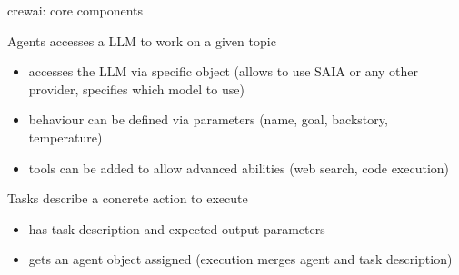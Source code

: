\documentclass[t]{beamer}
\numberwithin{equation}{section}
\begin{document}
	\begin{frame}[b]{crewai: core components}
		\begin{block}{Agents\autocite{agentPy}}
			accesses a LLM to work on a given topic
			\pause
			\begin{itemize}
				\item accesses the LLM via specific object (allows to use SAIA or any other provider, specifies which model to use)
				\item behaviour can be defined via parameters (name, goal, backstory, temperature)
				\item tools can be added to allow advanced abilities (web search, code execution)
			\end{itemize}
		\end{block}
		\pause
		\begin{block}{Tasks\autocite{taskPy}}
			describe a concrete action to execute
			\pause
			\begin{itemize}
				\item has task description and expected output parameters
				\item gets an agent object assigned (execution merges agent and task description)
			\end{itemize}
		\end{block}
	\end{frame}
\end{document}
